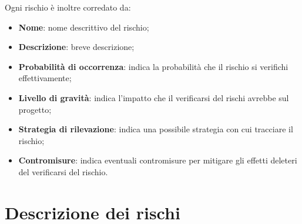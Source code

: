 \documentclass[../PianodiProgetto.tex]{subfiles}
\begin{document}
	Ogni rischio è inoltre corredato da:
	
	\begin{itemize}
		\item \textbf{Nome}: nome descrittivo del rischio;
		\item \textbf{Descrizione}: breve descrizione;
		\item \textbf{Probabilità di occorrenza}: indica la probabilità che il rischio si verifichi effettivamente;
		\item \textbf{Livello di gravità}: indica l'impatto che il verificarsi del rischi avrebbe sul progetto;
		\item \textbf{Strategia di rilevazione}: indica una possibile strategia con cui tracciare il rischio;
		\item \textbf{Contromisure}: indica eventuali contromisure per mitigare gli effetti deleteri del verificarsi del rischio.
	\end{itemize}
	
	\newpage
	\section{Descrizione dei rischi}
\end{document}
